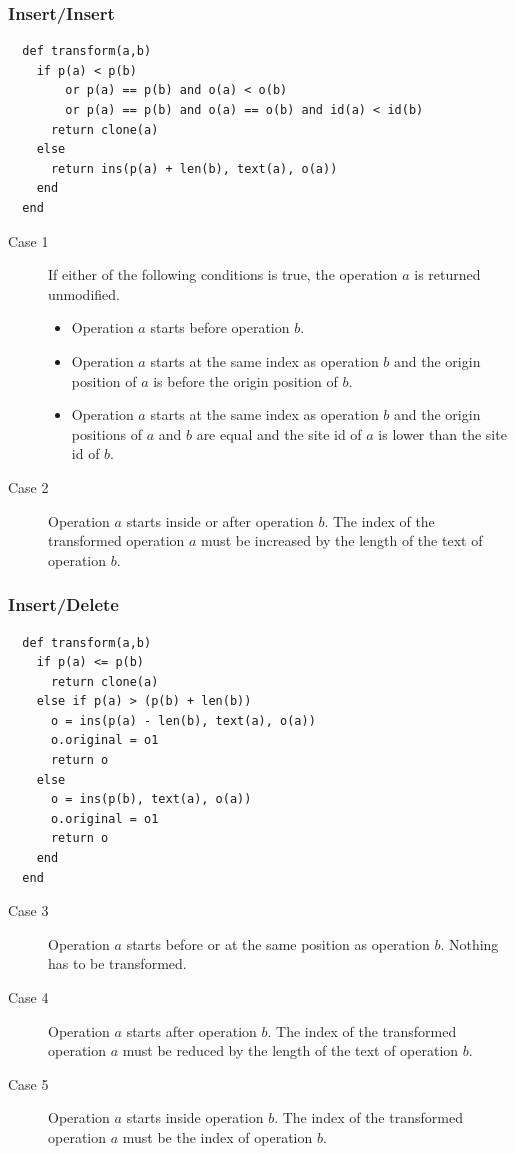 

\subsubsection{Insert/Insert}

\small{\begin{verbatim}
  def transform(a,b)
    if p(a) < p(b) 
        or p(a) == p(b) and o(a) < o(b) 
        or p(a) == p(b) and o(a) == o(b) and id(a) < id(b)
      return clone(a)
    else
      return ins(p(a) + len(b), text(a), o(a))
    end
  end
\end{verbatim}}

\begin{description}
 \item[Case 1] If either of the following conditions is true, the operation $a$ is returned unmodified.
 \begin{itemize}
  \item Operation $a$ starts before operation $b$.
  \item Operation $a$ starts at the same index as operation $b$ and the origin position of $a$ is before the origin position of $b$.
  \item Operation $a$ starts at the same index as operation $b$ and the origin positions of $a$ and $b$ are equal and the site id of $a$ is lower than the site id of $b$.
 \end{itemize}
 \item[Case 2] Operation $a$ starts inside or after operation $b$. The index of the transformed operation $a$ must be increased by the length of the text of operation $b$.
\end{description}


\subsubsection{Insert/Delete}

\small{\begin{verbatim}
  def transform(a,b)
    if p(a) <= p(b)
      return clone(a)
    else if p(a) > (p(b) + len(b))
      o = ins(p(a) - len(b), text(a), o(a))
      o.original = o1
      return o
    else 
      o = ins(p(b), text(a), o(a))
      o.original = o1
      return o
    end
  end
\end{verbatim}}

\begin{description}
 \item[Case 3] Operation $a$ starts before or at the same position as operation $b$. Nothing has to be transformed.
 \item[Case 4] Operation $a$ starts after operation $b$. The index of the transformed operation $a$ must be reduced by the length of the text of operation $b$.
 \item[Case 5] Operation $a$ starts inside operation $b$. The index of the transformed operation $a$ must be the index of operation $b$.
\end{description}


